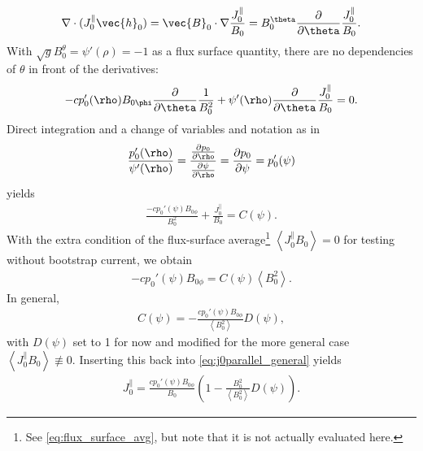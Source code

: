 \begin{gather}
  \divg(J_{0}^{\parallel} \vec{h}_{0}) = \vec{B}_{0} \cdot \grad \frac{J_{0}^{\parallel}}{B_{0}} = B_{0}^{\theta} \pd{\theta} \frac{J_{0}^{\parallel}}{B_{0}}.
\end{gather}
With $\sqrt{g} B_{0}^{\theta} = \psi'(\rho) = -1$ as a flux surface quantity, there are no dependencies of $\theta$ in front of the derivatives:
\begin{gather}
  -c p_{0}' (\rho) B_{0 \phi} \pd{\theta} \frac{1}{B_{0}^{2}} + \psi'(\rho) \pd{\theta} \frac{J_{0}^{\parallel}}{B_{0}} = 0.
\end{gather}
Direct integration and a change of variables and notation as in
\begin{gather}
  \frac{p_{0}'(\rho)}{\psi'(\rho)} = \frac{\pd[p_{0}]{\rho}}{\pd[\psi]{\rho}} = \pd[p_{0}]{\psi} = p_{0}'(\psi)
\end{gather}
yields
\begin{gather}
  \frac{-c p_{0}' (\psi) B_{0 \phi}}{B_{0}^{2}} + \frac{J_{0}^{\parallel}}{B_{0}} = C(\psi). \label{eq:j0parallel_general}
\end{gather}
With the extra condition of the flux-surface average\footnote{See \cref{eq:flux_surface_avg}, but note that it is not actually evaluated here.} $\left\langle J_{0}^{\parallel} B_{0} \right\rangle = 0$ for testing without bootstrap current, we obtain
\begin{gather}
  -c p_{0}'(\psi) B_{0 \phi} = C(\psi) \left\langle B_{0}^{2} \right\rangle.
\end{gather}
In general, 
\begin{gather}
  C(\psi) = -\frac{c p_{0}'(\psi) B_{0 \phi}}{\left\langle B_{0}^{2} \right\rangle} D(\psi),
\end{gather}
with $D(\psi)$ set to 1 for now and modified for the more general case $\left\langle J_{0}^{\parallel} B_{0} \right\rangle \not\equiv 0$. Inserting this back into \cref{eq:j0parallel_general} yields
\begin{gather}
  J_{0}^{\parallel} = \frac{c p_{0}'(\psi) B_{0 \phi}}{B_{0}} \left( 1 - \frac{B_{0}^{2}}{\left\langle B_{0}^{2} \right\rangle} D(\psi) \right).
\end{gather}

